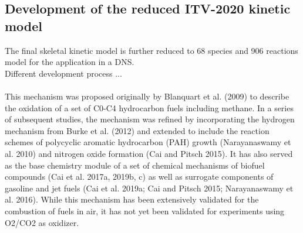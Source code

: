 \begin{refsection}
\subsection{Development of the reduced ITV-2020 kinetic model}
The final skeletal kinetic model is further reduced to 68 species and 906 reactions model for the application in a DNS.
\\
Different development process ...
\\\\
This mechanism was proposed originally by Blanquart et al. (2009) to describe the oxidation of a set of C0-C4 hydrocarbon fuels including methane. In a series of subsequent studies, the mechanism was refined by incorporating the hydrogen mechanism from Burke et al. (2012) and extended to include the reaction schemes of polycyclic aromatic hydrocarbon (PAH) growth (Narayanaswamy et al. 2010) and nitrogen oxide formation (Cai and Pitsch 2015). It has also served as the base chemistry module of a set of chemical mechanisms of biofuel compounds (Cai et al. 2017a, 2019b, c) as well as surrogate components of gasoline and jet fuels (Cai et  al. 2019a; Cai and Pitsch 2015; Narayanaswamy et al. 2016). While this mechanism has been extensively validated for the combustion of fuels in air, it has not yet been validated for experiments using O2/CO2 as oxidizer.



\newpage

\end{refsection}
